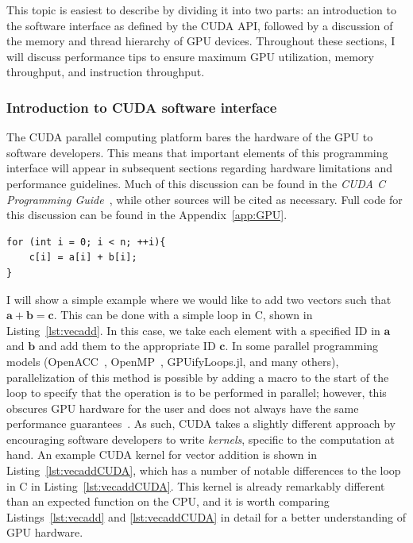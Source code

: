 This topic is easiest to describe by dividing it into two parts: an introduction to the software interface as defined by the CUDA API, followed by a discussion of the memory and thread hierarchy of GPU devices.
Throughout these sections, I will discuss performance tips to ensure maximum GPU utilization, memory throughput, and instruction throughput.

\subsubsection{Introduction to CUDA software interface}

The CUDA parallel computing platform bares the hardware of the GPU to software developers.
This means that important elements of this programming interface will appear in subsequent sections regarding hardware limitations and performance guidelines.
Much of this discussion can be found in the \textit{CUDA C Programming Guide}~\cite{CUDAPG}, while other sources will be cited as necessary.
Full code for this discussion can be found in the Appendix~\ref{app:GPU}.

\begin{lstlisting}[float,label=lst:vecadd,caption={An example of vector addition performed in C or C++ for $a$, $b$, and $c$, all of size $n$},style=c++]
for (int i = 0; i < n; ++i){
    c[i] = a[i] + b[i];
}
\end{lstlisting}

I will show a simple example where we would like to add two vectors such that $\mathbf{a} + \mathbf{b} = \mathbf{c}$.
This can be done with a simple loop in C, shown in Listing~\ref{lst:vecadd}.
In this case, we take each element with a specified ID in $\mathbf{a}$ and $\mathbf{b}$ and add them to the appropriate ID $\mathbf{c}$.
In some parallel programming models (OpenACC~\cite{wienke2012}, OpenMP~\cite{chandra2001}, GPUifyLoops.jl, and many others), parallelization of this method is possible by adding a macro to the start of the loop to specify that the operation is to be performed in parallel; however, this obscures GPU hardware for the user and does not always have the same performance guarantees~\cite{reyes2012}.
As such, CUDA takes a slightly different approach by encouraging software developers to write \textit{kernels}, specific to the computation at hand.
An example CUDA kernel for vector addition is shown in Listing~\ref{lst:vecaddCUDA}, which has a number of notable differences to the loop in C in Listing~\ref{lst:vecaddCUDA}.
This kernel is already remarkably different than an expected function on the CPU, and it is worth comparing Listings~\ref{lst:vecadd} and \ref{lst:vecaddCUDA} in detail for a better understanding of GPU hardware.

